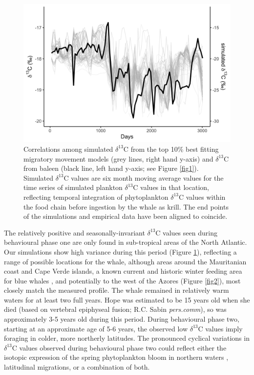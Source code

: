 \documentclass[a4paper,12pt]{article}
\begin{document}
\begin{figure}
 \centering
  \includegraphics[width = \linewidth]{figures/Figure-3-blue-sims.png}
  \caption{Correlations among simulated $\delta^{13}$C from the top 10\% best fitting migratory movement models (grey lines, right hand y-axis) and $\delta^{13}$C from baleen (black line, left hand y-axis; see Figure \ref{fig1}). 
  Simulated $\delta^{13}$C values are six month moving average values for the time series of simulated plankton $\delta^{13}$C values in that location, reflecting temporal integration of phytoplankton $\delta^{13}$C values within the food chain before ingestion by the whale as krill. 
  The end points of the simulations and empirical data have been aligned to coincide.
}
  \label{fig3}
\end{figure}
 
The relatively positive and seasonally-invariant $\delta^{13}$C values seen during behavioural phase one are only found in sub-tropical areas of the North Atlantic.  
Our simulations show high variance during this period (Figure \ref{fig3}), reflecting a range of possible locations for the whale, although areas around the Mauritanian coast and Cape Verde islands, a known current and historic winter feeding area for blue whales \cite{baines2014upwellings,reeves2004historical}, and potentially to the west of the Azores (Figure \ref{fig2}), most closely match the measured profile. 
The whale remained in relatively warm waters for at least two full years. 
Hope was estimated to be 15 years old when she died (based on vertebral epiphyseal fusion; R.C. Sabin \textit{pers.comm}), so was approximately 3-5 years old during this period.
During behavioural phase two, starting at an approximate age of 5-6 years, the observed low $\delta^{13}$C values imply foraging in colder, more northerly latitudes. 
The pronounced cyclical variations in $\delta^{13}$C values observed during behavioural phase two could reflect either the isotopic expression of the spring phytoplankton bloom in northern waters \cite{magozzi2017using}, latitudinal migrations, or a combination of both.  
\end{document}
